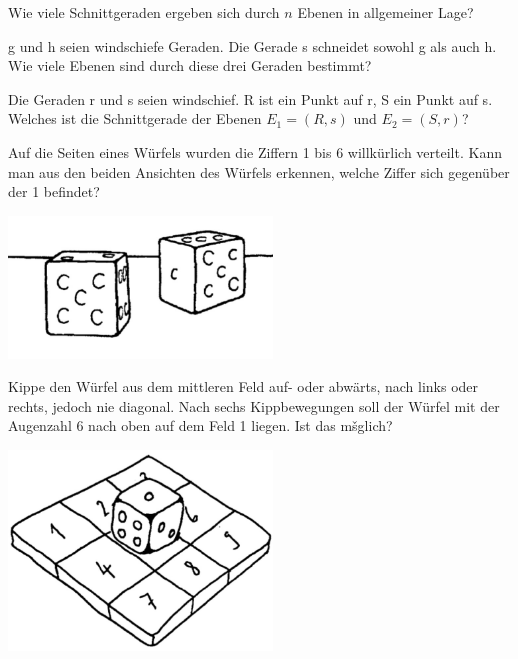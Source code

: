\documentclass[%
11pt,%
twoside,%
titlepage,%
german,%
headsepline%
]{scrartcl}
\begin{document}
\begin{ueb}
Wie viele Schnittgeraden ergeben sich durch $n$ Ebenen in allgemeiner Lage?
\end{ueb}
\begin{ueb}
g und h seien windschiefe Geraden. Die Gerade s schneidet sowohl g als auch h. Wie viele Ebenen sind durch diese drei Geraden bestimmt?
\end{ueb}
\begin{ueb}
Die Geraden r und s seien windschief. R ist ein Punkt auf r, S ein Punkt auf s. Welches ist die Schnittgerade der Ebenen $E_1=(R,s)$ und $E_2=(S,r)$?
\end{ueb}

\begin{ueb}
Auf die Seiten eines W\"urfels wurden die Ziffern 1 bis 6 willk\"urlich verteilt. Kann man aus den beiden Ansichten des W\"urfels erkennen, welche Ziffer sich gegen\"uber der 1 befindet?
\begin{center}
\includegraphics[width=7cm]{pictures/wuerfel}
\end{center}
\end{ueb}

\begin{ueb}
Kippe den W\"urfel aus dem mittleren Feld auf- oder abw\"arts, nach links oder rechts, jedoch nie diagonal. Nach sechs Kippbewegungen soll der W\"urfel mit der Augenzahl 6 nach oben auf dem Feld 1 liegen. Ist das mšglich?
\begin{center}
\includegraphics[width=7cm]{pictures/wuerfelfeld}
\end{center}
\end{ueb}
\end{document}

